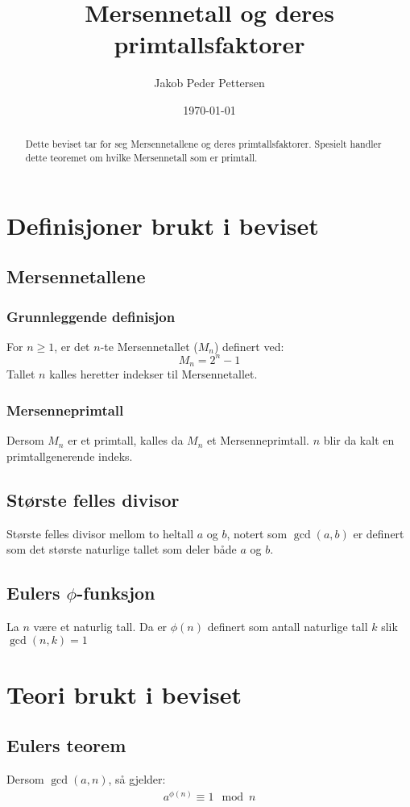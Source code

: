 \documentclass[a4paper,twoside]{article}
\title{Mersennetall og deres primtallsfaktorer}
\author{Jakob Peder Pettersen}
\date{\today}
\theoremstyle{plain}
\begin{document}
\maketitle
\begin{abstract}
Dette beviset tar for seg Mersennetallene og deres primtallsfaktorer. Spesielt handler dette teoremet om hvilke Mersennetall som er primtall.
\end{abstract}
\tableofcontents \newpage
\section{Definisjoner brukt i beviset}
\subsection{Mersennetallene}
\subsubsection{Grunnleggende definisjon}
For $n\geq 1$, er det $n$-te Mersennetallet ($M_n$) definert ved:
\[
M_n=2^{n}-1
\]
Tallet $n$ kalles heretter indekser til Mersennetallet.
\subsubsection{Mersenneprimtall}
Dersom $M_n$ er et primtall, kalles da $M_n$ et Mersenneprimtall. $n$ blir da kalt en primtallgenerende indeks.
\subsection{Største felles divisor}
Største felles divisor mellom to heltall $a$ og $b$, notert som $\gcd\left(a,b\right)$ er definert som det største naturlige tallet som deler både $a$ og $b$.
\subsection{Eulers $\phi$-funksjon}
La $n$ være et naturlig tall. Da er $\phi(n)$ definert som antall naturlige tall $k$ slik $\gcd(n,k)=1$
\section{Teori brukt i beviset}
\subsection{Eulers teorem}
Dersom $\gcd(a,n)$, så gjelder:
\begin{align}
	a^{\phi(n)} \equiv 1 \mod n
\end{align}
\end{document}
